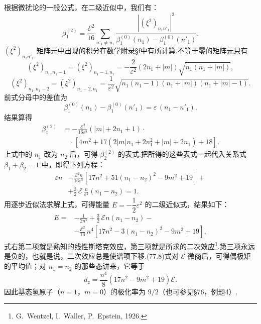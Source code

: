 根据微扰论的一般公式，在二级近似中，我们有：
\begin{equation*}
  \beta_1^{(2)}=\frac{\mathcal{E}^{2}}{16}
  \sum_{n'_1\neq n_1}
  \frac{\left|\left(\xi^{2}\right)_{n_1n'_1}\right|^{2}}
  {\beta_1^{(0)}(n_1)-\beta_1^{(0)}(n'_1)}.
\end{equation*}
$\left(\xi^{2}\right)_{n_1n'_1}$ 矩阵元中出现的积分在数学附录§f中有所计算.不等于零的矩阵元只有
\begin{equation*}
  \left(\xi^{2}\right)_{n_1,n_1-1}=\left(\xi^{2}\right)_{n_1-1,n_1}
  =-\frac{2}{\varepsilon^{2}}\left(2n_1+|m|\right)\sqrt{n_1(n_1+|m|)},
\end{equation*}
\begin{equation*}
  \left(\xi^{2}\right)_{n_1,n_1-2}=\left(\xi^{2}\right)_{n_1-2,n_1}
  =\frac{1}{\varepsilon^{2}}
  \sqrt{n_1(n_1-1)(n_1+|m|)(n_1+|m|-1)}.
\end{equation*}
前式分母中的差值为
\begin{equation*}
  \beta_1^{(0)}(n_1)-\beta_1^{(0)}(n'_1)=\varepsilon\,(n_1-n'_1).
\end{equation*}
结果算得
\begin{equation*}
\begin{aligned}
  \beta_1^{(2)}&=-\frac{\mathcal{E}^{2}}{16\varepsilon^{5}}
  \left(|m|+2n_1+1\right)\cdot\\
  &\quad\cdot\left[4m^{2}+17\left(2|m|n_1+2n_1^{2}+|m|+2n_1\right)+18\right].
\end{aligned}
\end{equation*}
上式中的 $n_1$ 改为 $n_2$ 后，可得 $\beta_2^{(2)}$ 的表式.把所得的这些表式一起代入关系式 $\beta_1+\beta_2=1$ 中，即得下列方程：
\begin{equation*}
\begin{aligned}
  \varepsilon n&-\frac{\mathcal{E}^{2}n}{16\varepsilon^{5}}
  \left[17n^{2}+51(n_1-n_2)^{2}-9m^{2}+19\right]+\\
  &+\frac{3}{2}\,\mathcal{E}\,\frac{n}{\varepsilon^{2}}(n_1-n_2)=1.
\end{aligned}
\end{equation*}
用逐步近似法求解上式，可得能量 $E=-\dfrac{1}{2}\varepsilon^{2}$ 的二级近似式，结果如下：
\begin{equation}
\begin{aligned}
  E={}&-\frac{1}{2n^{2}}+\frac{3}{2}\,\mathcal{E}n(n_1-n_2)-\\
  &-\frac{\mathcal{E}^{2}}{16}\,n^{4}
  \left[17n^{2}-3(n_1-n_2)^{2}-9m^{2}+19\right],
\end{aligned}
\end{equation}
式右第二项就是熟知的线性斯塔克效应，第三项就是所求的二次效应\footnote{G.~Wentzel, I.~Waller, P.~Epstein, 1926.}.第三项永远是负的，也就是说，二次效应总是使谱项下移.(77.8)式对 $\mathcal{E}$ 微商后，可得偶极矩的平均值；对 $n_1=n_2$ 的那些态讲来，它等于
\begin{equation}
  \overline{d}_z=\frac{n^{4}}{8}\left(17n^{2}-9m^{2}+19\right)\mathcal{E}.
\end{equation}
因此基态氢原子（$n=1$，$m=0$）的极化率为 $9/2$（也可参见§76，例题4）.


